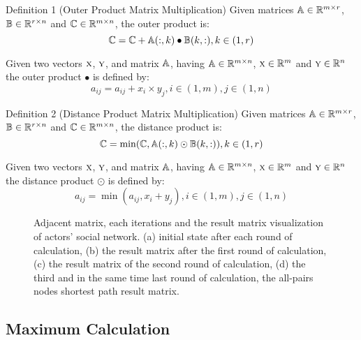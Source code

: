 \documentclass[review]{cvpr}
\begin{document}
Definition 1 (Outer Product Matrix Multiplication) Given matrices \(\Bbb A \in \Bbb R^{m\times r}\), \(\Bbb B \in \Bbb R^{r\times n}\) and \(\Bbb C \in \Bbb R^{m\times n}\), the outer product is:
\begin{equation}
\Bbb C = \Bbb C  + \Bbb A(:,k)\bullet \Bbb B(k,:) , k \in (1,r)
\end{equation}

Given two vectors \(\textsc x\), \(\textsc y\), and matrix \(\Bbb A\), having \(\Bbb A \in \Bbb R^{m\times n}\), \(\textsc x \in \Bbb R^{m}\) and \(\textsc y \in \Bbb R^{n}\) the outer product \(\bullet\) is defined by:
\begin{equation}
a_{ij} = a_{ij} + x_i \times  y_j, i \in (1,m), j \in (1,n)
\end{equation}

Definition 2 (Distance Product Matrix Multiplication) Given matrices \(\Bbb A \in \Bbb R^{m\times r}\), \(\Bbb B \in \Bbb R^{r\times n}\) and \(\Bbb C \in \Bbb R^{m\times n}\), the distance product is:
\begin{equation}
  \Bbb C = \min(\Bbb C, \Bbb A(:,k)\odot \Bbb B(k,:)) , k \in (1,r)
\end{equation}

Given two vectors \(\textsc x\), \(\textsc y\), and matrix \(\Bbb A\), having \(\Bbb A \in \Bbb R^{m\times n}\), \(\textsc x \in \Bbb R^{m}\) and \(\textsc y \in \Bbb R^{n}\) the distance product \(\odot\) is defined by:
\begin{equation}
a_{ij} = \min(a_{ij} , x_i + y_j), i \in (1,m), j \in (1,n)
\end{equation}
\begin{figure*}
\begin{center}
\end{center}
   \caption{Adjacent matrix, each iterations and the result matrix visualization of actors' social network. (a) initial state after each round of calculation, (b) the result matrix after the first round of calculation, (c) the result matrix of the second round of calculation, (d) the third and in the same time last round of calculation, the all-pairs nodes shortest path result matrix.}
\label{fig:short}
\end{figure*}


\subsection{Maximum Calculation}
\end{document}
